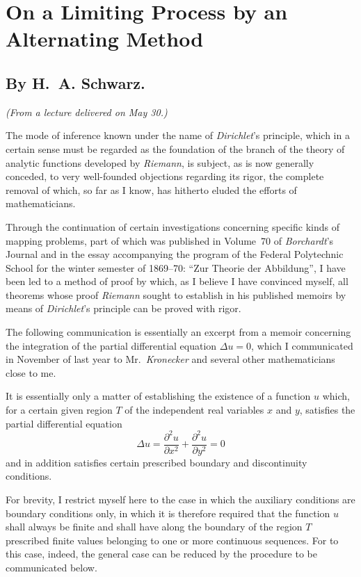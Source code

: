 \documentclass{article}
\begin{document}

\section*{On a Limiting Process by an Alternating Method}

\subsection*{By \textbf{H.~A. Schwarz.}}

\emph{(From a lecture delivered on May 30.)}


The mode of inference known under the name of \emph{Dirichlet}'s principle, which in a certain sense must be regarded as the foundation of the branch of the theory of analytic functions developed by \emph{Riemann}, is subject, as is now generally conceded, to very well-founded objections regarding its rigor, the complete removal of which, so far as I know, has hitherto eluded the efforts of mathematicians.

Through the continuation of certain investigations concerning specific kinds of mapping problems, part of which was published in Volume~70 of \emph{Borchardt}'s Journal and in the essay accompanying the program of the Federal Polytechnic School for the winter semester of 1869--70: ``Zur Theorie der Abbildung'', I have been led to a method of proof by which, as I believe I have convinced myself, all theorems whose proof \emph{Riemann} sought to establish in his published memoirs by means of \emph{Dirichlet}'s principle can be proved with rigor.


The following communication is essentially an excerpt from a memoir concerning the integration of the partial differential equation $\Delta u = 0$, which I communicated in November of last year to Mr.~\emph{Kronecker} and several other mathematicians close to me.

It is essentially only a matter of establishing the existence of a function $u$ which, for a certain given region $T$ of the independent real variables $x$ and $y$, satisfies the partial differential equation
\[
\Delta u = \frac{\partial^2 u}{\partial x^2} + \frac{\partial^2 u}{\partial y^2} = 0
\]
and in addition satisfies certain prescribed boundary and discontinuity conditions.

For brevity, I restrict myself here to the case in which the auxiliary conditions are boundary conditions only, in which it is therefore required that the function $u$ shall always be finite and shall have along the boundary of the region $T$ prescribed finite values belonging to one or more continuous sequences. For to this case, indeed, the general case can be reduced by the procedure to be communicated below.
\end{document}
